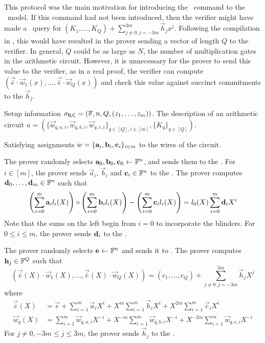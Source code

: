 This protocol was the main motivation for introducing the \ILCcheck\ command to the \ILC\ model. If this command had not been introduced, then the verifier might have made a \ILCopen\ query for $(K_1,\ldots,K_Q) + \sum_{j\neq 0, j=-3m}^{3m} \vec{h}_j {x^j}$. Following the compilation in \cite{BootleCGGHJ17}, this would have resulted in the prover sending a vector of length $Q$ to the verifier. In general, $Q$ could be as large as $N$, the number of multiplication gates in the arithmetic circuit. However, it is unnecessary for the prover to send this value to the verifier, as in a real proof, the verifier can compute $( \vec{\bar{e}}\cdot \vec{w}_1(x),\ldots, \vec{\bar{e}}\cdot \vec{w}_Q(x) )$ and check this value against succinct commitments to the $\vec{h}_j$.

\begin{description}\label{prot:3ac}
\item[Common input:] Setup information $\mathsf{\sigma}_{\mathsf{ILC}} = (\mathbb{F},n,Q,(z_1,\ldots,z_m))$. The description of an arithmetic circuit $u = \left( \{\vec{w}_{q,{a,i}},\vec{w}_{q,{b,i}},\vec{w}_{q,{c,i}}\}_{q \in [Q], i \in [m]}, \{K_{q}\}_{q \in [Q]}\right)$.
\item[Prover's witness:] Satisfying assignments $w = \{\mathbf{a}_i,\mathbf{b}_i,\mathbf{c}_i\}_{i \in m}$ to the wires of the circuit.
\item[Protocol:]
\item[\ P:]

The prover randomly selects $\mathbf{a}_{0},\mathbf{b}_{0},\mathbf{c}_{0}\gets \mathbb{F}^n$, and sends them to the \ILC. For $i \in [m]$, the prover sends $\vec{a}_{i}$, $\vec{b}_{i}$ and $\mathbf{c}_{i} \in \mathbb{F}^n$ to the \ILC. The prover computes $\mathbf{d}_0,\ldots,\mathbf{d}_m \in \mathbb{F}^n$ such that
\[
\left( \sum_{i=0}^m \mathbf{a}_{i} l_i(X) \right) \circ \left( \sum_{i=0}^m \mathbf{b}_{i} l_i(X) \right) - \left( \sum_{i=0}^m \mathbf{c}_{i} l_i(X) \right) = l_0(X) \sum_{i=0}^m \mathbf{d}_i X^i
\]
Note that the sums on the left begin from $i=0$ to incorporate the blinders. For $0 \leq i \leq m$, the prover sends $\mathbf{d}_i$ to the \ILC.

The prover randomly selects $\mathbf{e} \gets \mathbb{F}^n$ and sends it to \ILC. The prover computes $\mathbf{h}_j \in \mathbb{F}^Q$ such that
\[
(\vec{\bar{e}}(X)\cdot \vec{w}_1(X),\ldots,\vec{\bar{e}}(X)\cdot \vec{w}_Q(X)) = (c_1,\ldots,c_Q) + \sum_{j\neq 0,j=-3m}^{3m} \vec{h}_{j} X^j
\]
where
\begin{align*}
\vec{\bar{e}}(X) &= \vec{e} + \sum_{i=1}^m \vec{a}_{i} X^i + X^m \sum_{i=1}^m \vec{b}_{i} X^i + X^{2m} \sum_{i=1}^m \vec{c}_{i} X^i \\
\vec{w}_q(X) &= \sum_{i=1}^m \vec{w}_{q,a,i} X^{-i} + X^{-m} \sum_{i=1}^m \vec{w}_{q,b,i} X^{-i} + X^{-2m} \sum_{i=1}^m \vec{w}_{q,c,i} X^{-i}
\end{align*}
For $j\neq 0,-3m \leq j \leq 3m$, the prover sends $\vec{h}_j$ to the \ILC.


\end{description}
